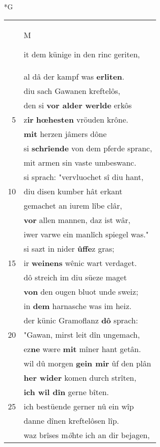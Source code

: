 \documentclass[8pt,a4paper,notitlepage]{article}
\begin{document}
\begin{table}[ht]
\begin{minipage}[t]{0.5\linewidth}
\small
\begin{center}*G
\end{center}
\begin{tabular}{rl}
 & \begin{large}M\end{large}it dem künige in den rinc geriten,\\ 
 & al dâ der kampf was \textbf{erliten}.\\ 
 & diu sach Gawanen kreftelôs,\\ 
 & den si \textbf{vor alder werlde} erkôs\\ 
5 & z\textbf{ir} \textbf{hœhesten} vröuden krône.\\ 
 & \textbf{mit} herzen jâmers dône\\ 
 & si \textbf{schrîende} von dem pferde spranc,\\ 
 & mit armen sin vaste umbeswanc.\\ 
 & si sprach: "vervluochet sî diu hant,\\ 
10 & diu disen kumber hât erkant\\ 
 & gemachet an iurem lîbe clâr,\\ 
 & \textbf{vor} allen mannen, daz ist wâr,\\ 
 & iwer varwe ein manlîch spiegel was."\\ 
 & si sazt in nider \textbf{ûffe}z gras;\\ 
15 & ir \textbf{weinens} wênic wart verdaget.\\ 
 & dô streich im diu süeze maget\\ 
 & \textbf{von} den ougen bluot unde sweiz;\\ 
 & in \textbf{dem} harnasche was im heiz.\\ 
 & der künic Gramoflanz \textbf{dô} sprach:\\ 
20 & "Gawan, mirst leit dîn ungemach,\\ 
 & ez\textbf{ne} wære \textbf{mit} mîner hant getân.\\ 
 & wil dû morgen \textbf{gein mir} ûf den plân\\ 
 & \textbf{her wider} komen durch strîten,\\ 
 & \textbf{ich wil dîn} gerne bîten.\\ 
25 & ich bestüende gerner nû ein wîp\\ 
 & danne dînen kreftelôsen lîp.\\ 
 & waz brîses m\textit{ö}hte ich an dir bejagen,\\ 

\end{tabular}
\end{minipage}
\end{table}
\end{document}
